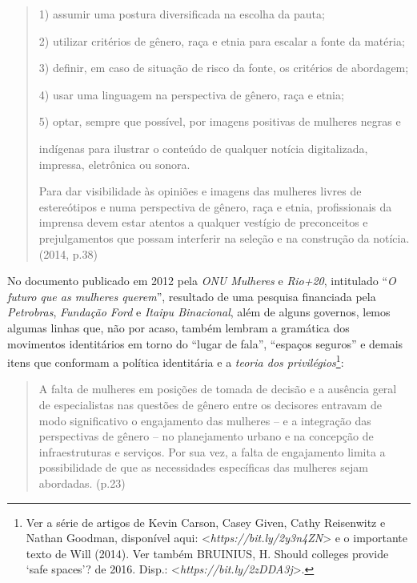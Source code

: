 \begin{quote}
1) assumir uma postura diversificada na escolha da pauta;

2) utilizar critérios de gênero, raça e etnia para escalar a fonte da
matéria;

3) definir, em caso de situação de risco da fonte, os critérios de
abordagem;

4) usar uma linguagem na perspectiva de gênero, raça e etnia;

5) optar, sempre que possível, por imagens positivas de mulheres negras
e

indígenas para ilustrar o conteúdo de qualquer notícia digitalizada,
impressa, eletrônica ou sonora.

Para dar visibilidade às opiniões e imagens das mulheres livres de
estereótipos e numa perspectiva de gênero, raça e etnia, profissionais
da imprensa devem estar atentos a qualquer vestígio de preconceitos e
prejulgamentos que possam interferir na seleção e na construção da
notícia. (2014, p.38)
\end{quote}

No documento publicado em 2012 pela \emph{ONU Mulheres} e \emph{Rio+20},
intitulado ``\emph{O futuro que as mulheres querem}'', resultado de uma
pesquisa financiada pela \emph{Petrobras}, \emph{Fundação Ford} e
\emph{Itaipu Binacional}, além de alguns governos, lemos algumas linhas
que, não por acaso, também lembram a gramática dos movimentos
identitários em torno do ``lugar de fala'', ``espaços seguros'' e demais
itens que conformam a política identitária e a \emph{teoria dos
privilégios}\footnote{Ver a série de artigos de Kevin Carson, Casey
  Given, Cathy Reisenwitz e Nathan Goodman, disponível aqui:
  \textless{}\emph{https://bit.ly/2y3n4ZN}\textgreater{} e o
  importante texto de Will (2014). Ver também BRUINIUS, H. Should
  colleges provide `safe spaces'? de 2016. Disp.:
  \textless{}\emph{https://bit.ly/2zDDA3j}\textgreater{}.}:

\begin{quote}
A falta de mulheres em posições de tomada de decisão e a ausência geral
de especialistas nas questões de gênero entre os decisores entravam de
modo significativo o engajamento das mulheres -- e a integração das
perspectivas de gênero -- no planejamento urbano e na concepção de
infraestruturas e serviços. Por sua vez, a falta de engajamento limita a
possibilidade de que as necessidades específicas das mulheres sejam
abordadas. (p.23)
\end{quote}

